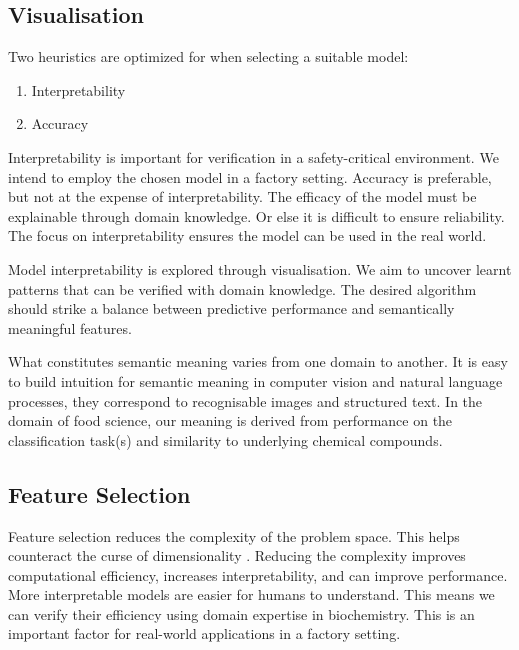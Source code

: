 \documentclass[runningheads]{llncs}
\begin{document}
\subsection{Visualisation}
\label{sec:background-visualisation}

Two heuristics are optimized for when selecting a suitable model:

\begin{enumerate}
  \item Interpretability
  \item Accuracy
\end{enumerate}

Interpretability is important for verification in a safety-critical environment.
We intend to employ the chosen model in a factory setting.
Accuracy is preferable, but not at the expense of interpretability.
The efficacy of the model must be explainable through domain knowledge.
Or else it is difficult to ensure reliability.
The focus on interpretability ensures the model can be used in the real world.

Model interpretability is explored through visualisation.
We aim to uncover learnt patterns that can be verified with domain knowledge.
The desired algorithm should strike a balance between predictive performance and semantically meaningful features.

What constitutes semantic meaning varies from one domain to another.
It is easy to build intuition for semantic meaning in computer vision and natural language processes, they correspond to recognisable images and structured text.
In the domain of food science, our meaning is derived from performance on the classification task(s) and similarity to underlying chemical compounds.

\subsection{Feature Selection}
\label{sec:background-feature-selection}

Feature selection reduces the complexity of the problem space.
This helps counteract the curse of dimensionality \cite{koppen2000curse}.
Reducing the complexity improves computational efficiency, increases interpretability, and can improve performance.
More interpretable models are easier for humans to understand.
This means we can verify their efficiency using domain expertise in biochemistry.
This is an important factor for real-world applications in a factory setting.
\end{document}
